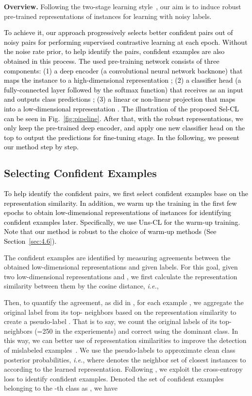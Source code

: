 \documentclass[10pt,twocolumn,letterpaper]{article}
\newcommand{\myPara}[1]{\vspace{.05in}\noindent\textbf{#1}}
\begin{document}
\myPara{Overview.} Following the two-stage learning style~\cite{Ortego2021,Li2021ICLR,Ghosh2021,Zheltonozhskii2021}, our aim is to induce robust pre-trained representations of instances for learning with noisy labels.

\textcolor{black}{To achieve it, our approach progressively selects better confident pairs  out of noisy pairs for performing supervised contrastive learning at each epoch. Without the noise rate prior, to help identify the pairs, confident examples  are also obtained in this process. The used pre-training network consists of three components: (1) a deep encoder  (a convolutional neural network backnone) that maps the instance  to a high-dimensional representation ; (2) a classifier head (a fully-connected layer followed by the softmax function) that receives  as an input and outputs class predictions ; (3) a linear or non-linear projection that maps   into a low-dimensional representation .  The illustration of the proposed Sel-CL can be seen in Fig.~\ref{fig:pipeline}.
After that, with the robust representations, we only keep the pre-trained deep encoder, and apply one new classifier head on the top to output the predictions for fine-tuning stage. In the following, we present our method step by step.}

\vspace{-3pt}
\subsection{Selecting Confident Examples}
\textcolor{black}{To help identify the confident pairs, we first select confident examples base on the representation similarity.
In addition, we warm up the training in the first few epochs to obtain  low-dimensional representations of instances for identifying confident examples later. Specifically, we use Uns-CL \cite{chen2020simple} for the warm-up training. Note that our method is robust to the choice of warm-up methods (See Section~\ref{sec:4.6}).} 

The confident examples are identified by measuring agreements between the obtained low-dimensional representations and given labels. For this goal, given two low-dimensional representations  and , we first calculate the representation similarity between them by the cosine distance, \textit{i.e.},

Then, to quantify the agreement, as did in \cite{Ortego2021}, for each example , we aggregate the original label from its top- neighbors based on the representation similarity to create a pseudo-label . That is to say, we count the original labels of its top- neighbors (=250 in the experiements) and correct  using the dominant class. In this way, we can better use of representation similarities to improve the detection of mislabeled examples~\cite{Ortego2021}. We use the pseudo-labels to approximate clean class posterior probabilities, \textit{i.e.}, 	
where  denotes the neighbor set of  closest instances to  according to the learned representation. Following \cite{Han2018NIPS}, we exploit the cross-entropy loss  to identify confident examples. Denoted the set of confident examples belonging to the -th class as , we have 
	
\end{document}
